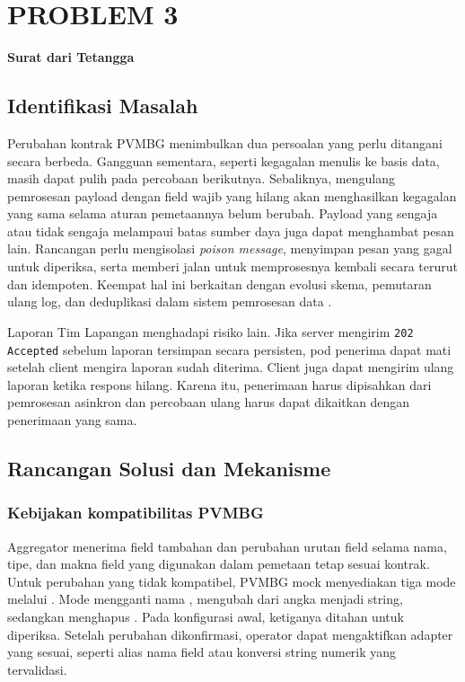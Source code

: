 \chapter{PROBLEM 3}
\label{ch:p3}

\begin{center}\large\bfseries Surat dari Tetangga\end{center}

\section{Identifikasi Masalah}

Perubahan kontrak PVMBG menimbulkan dua persoalan yang perlu ditangani secara berbeda. Gangguan sementara, seperti kegagalan menulis ke basis data, masih dapat pulih pada percobaan berikutnya. Sebaliknya, mengulang pemrosesan payload dengan field wajib yang hilang akan menghasilkan kegagalan yang sama selama aturan pemetaannya belum berubah. Payload yang sengaja atau tidak sengaja melampaui batas sumber daya juga dapat menghambat pesan lain. Rancangan perlu mengisolasi \emph{poison message}, menyimpan pesan yang gagal untuk diperiksa, serta memberi jalan untuk memprosesnya kembali secara terurut dan idempoten. Keempat hal ini berkaitan dengan evolusi skema, pemutaran ulang log, dan deduplikasi dalam sistem pemrosesan data \cite{kleppmann2017}.

Laporan Tim Lapangan menghadapi risiko lain. Jika server mengirim \texttt{202 Accepted} sebelum laporan tersimpan secara persisten, pod penerima dapat mati setelah client mengira laporan sudah diterima. Client juga dapat mengirim ulang laporan ketika respons hilang. Karena itu, penerimaan harus dipisahkan dari pemrosesan asinkron dan percobaan ulang harus dapat dikaitkan dengan penerimaan yang sama.

\section{Rancangan Solusi dan Mekanisme}

\subsection{Kebijakan kompatibilitas PVMBG}

Aggregator menerima field tambahan dan perubahan urutan field selama nama, tipe, dan makna field yang digunakan dalam pemetaan tetap sesuai kontrak. Untuk perubahan yang tidak kompatibel, PVMBG mock menyediakan tiga mode melalui . Mode  mengganti nama ,  mengubah  dari angka menjadi string, sedangkan  menghapus . Pada konfigurasi awal, ketiganya ditahan untuk diperiksa. Setelah perubahan dikonfirmasi, operator dapat mengaktifkan adapter yang sesuai, seperti alias nama field atau konversi string numerik yang tervalidasi.

